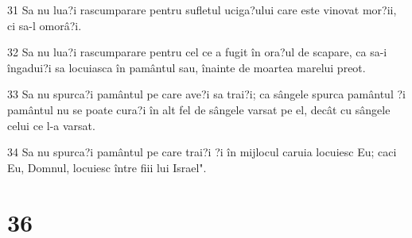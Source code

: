 \par 31 Sa nu lua?i rascumparare pentru sufletul uciga?ului care este vinovat mor?ii, ci sa-l omorâ?i.
\par 32 Sa nu lua?i rascumparare pentru cel ce a fugit în ora?ul de scapare, ca sa-i îngadui?i sa locuiasca în pamântul sau, înainte de moartea marelui preot.
\par 33 Sa nu spurca?i pamântul pe care ave?i sa trai?i; ca sângele spurca pamântul ?i pamântul nu se poate cura?i în alt fel de sângele varsat pe el, decât cu sângele celui ce l-a varsat.
\par 34 Sa nu spurca?i pamântul pe care trai?i ?i în mijlocul caruia locuiesc Eu; caci Eu, Domnul, locuiesc între fiii lui Israel".

\chapter{36}

